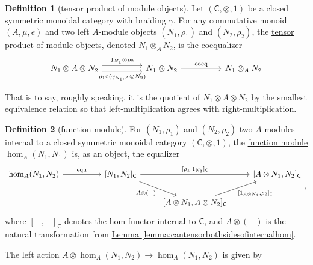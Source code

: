 \documentclass[a4paper]{report}
\newcommand{\defn}[1]{\ul{#1}}
\theoremstyle{definition}
\newtheorem{definition}{Definition}[section]
\theoremstyle{plain}
\theoremstyle{remark}
\begin{document}
\begin{definition}[tensor product of module objects]
  \label{def:tensorproductofmoduleobjects}
  Let $(\mathsf{C}, \otimes, 1)$ be a closed symmetric monoidal category with braiding $\gamma$. For any commutative monoid $(A, \mu, e)$ and two left $A$-module objects $(N_{1}, \rho_{1})$ and $(N_{2}, \rho_{2})$, the \defn{tensor product of module objects}, denoted $N_{1} \otimes_{A} N_{2}$, is the coequalizer
  \begin{equation*}
    \begin{tikzcd}[column sep=huge]
      N_{1} \otimes A \otimes N_{2}
      \arrow[r, shift left=1.5, "1_{N_{1}} \otimes \rho_{2}"]
      \arrow[r, shift right=1.5, swap, "{\rho_{1} \circ (\gamma_{N_{1}, A} \otimes N_{2})}"]
      & N_{1} \otimes N_{2}
      \arrow[r, "\mathrm{coeq}"]
      & N_{1} \otimes_{A} N_{2}
    \end{tikzcd}
  \end{equation*}

  That is to say, roughly speaking, it is the quotient of $N_{1} \otimes A \otimes N_{2}$ by the smallest equivalence relation so that left-multiplication agrees with right-multiplication.
\end{definition}

\begin{definition}[function module]
  \label{def:functionmodule}
  For $(N_{1}, \rho_{1})$ and $(N_{2}, \rho_{2})$ two $A$-modules internal to a closed symmetric monoidal category $(\mathsf{C}, \otimes, 1)$, the \defn{function module} $\hom_{A}(N_{1}, N_{1})$ is, as an object, the equalizer 
  \begin{equation*}
    \begin{tikzcd}
      \hom_{A}(N_{1}, N_{2})
      \arrow[rr, "\mathrm{equ}"]
      & & {[N_{1}, N_{2}]_{\mathsf{C}}}
      \arrow[rr, "{[\rho_{1}, 1_{N_{2}}]_{\mathsf{C}}}"]
      \arrow[dr, swap, "A \otimes (-)"]
      & & {[A \otimes N_{1}, N_{2}]_{\mathsf{C}}}
      \\
      & & & {[A \otimes N_{1}, A \otimes N_{2}]_{\mathsf{C}}}
      \arrow[ur, swap, "{[1_{A \otimes N_{1}}, \rho_2]_{\mathsf{C}}}"]
    \end{tikzcd},
  \end{equation*}
  where $[-,-]_{\mathsf{C}}$ denotes the hom functor internal to $\mathsf{C}$, and $A \otimes (-)$ is the natural transformation from \hyperref[lemma:cantensorbothsidesofinternalhom]{Lemma \ref*{lemma:cantensorbothsidesofinternalhom}}.

  The left action $A \otimes \hom_{A}(N_{1}, N_{2}) \to \hom_{A}(N_{1}, N_{2})$ is given by 
\end{definition}
\end{document}
